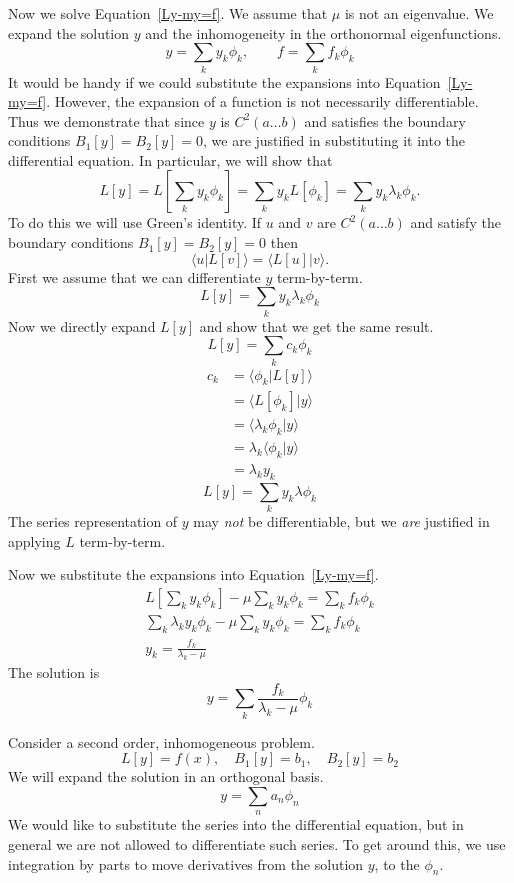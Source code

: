 Now we solve Equation~\ref{Ly-my=f}.  We assume that $\mu$ is not an
eigenvalue.  We expand the solution $y$ and the inhomogeneity in the 
orthonormal eigenfunctions.
\[
y = \sum_k y_k \phi_k, \qquad
f = \sum_k f_k \phi_k
\]
It would be handy if we could substitute the expansions 
into Equation~\ref{Ly-my=f}.  However, the expansion of a function is
not necessarily differentiable.  Thus we demonstrate that since $y$ is
$C^2(a \ldots b)$ and satisfies the boundary conditions $B_1[y] =
B_2[y] = 0$, we are justified in substituting it into the differential
equation.  In particular, we will show that
\[
L[y] = L \left[ \sum_k y_k \phi_k \right]
= \sum_k y_k L \left[ \phi_k \right]
= \sum_k y_k \lambda_k \phi_k.
\]
To do this we will use Green's identity.  If $u$ and $v$ are 
$C^2(a \ldots b)$ and satisfy the boundary conditions $B_1[y] =
B_2[y] = 0$ then
\[
\langle u | L[v] \rangle = \langle L[u] | v \rangle.
\]
First we assume that we can differentiate $y$ term-by-term.
\[
L[y] = \sum_k y_k \lambda_k \phi_k
\]
Now we directly expand $L[y]$ and show that we get the same result.
\[
L[y] = \sum_k c_k \phi_k
\]
\begin{align*}
  c_k     &= \langle \phi_k | L[y] \rangle \\
  &= \langle L[ \phi_k ] | y \rangle \\
  &= \langle \lambda_k \phi_k | y \rangle \\
  &= \lambda_k \langle \phi_k | y \rangle \\
  &= \lambda_k y_k
\end{align*}
\[
L[y] = \sum_k y_k \lambda \phi_k
\]
The series representation of $y$ may \textit{not} be differentiable, 
but we \textit{are} justified in applying $L$ term-by-term.

Now we substitute the expansions into Equation~\ref{Ly-my=f}.
\begin{gather*}
  L \left[ \sum_k y_k \phi_k \right] - \mu \sum_k y_k \phi_k 
  = \sum_k f_k \phi_k \\
  \sum_k \lambda_k y_k \phi_k - \mu \sum_k y_k \phi_k 
  = \sum_k f_k \phi_k \\
  y_k = \frac{ f_k }{ \lambda_k - \mu }
\end{gather*}
The solution is
\[
y = \sum_k \frac{ f_k }{ \lambda_k - \mu } \phi_k
\]









Consider a second order, inhomogeneous problem.
\[
L[y] = f(x), \quad B_1[y] = b_1, \quad B_2[y] = b_2
\]
We will expand the solution in an orthogonal basis.
\[
y = \sum_n a_n \phi_n
\]
We would like to substitute the series into the differential equation,
but in general we are not allowed to differentiate such series.  To
get around this, we use integration by parts to move derivatives from
the solution $y$, to the $\phi_n$.










